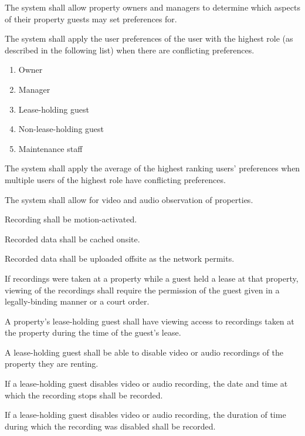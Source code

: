 \documentclass[letter,titlepage,oneside,english]{report}
\begin{document}
\begin{fr}
\begin{fr}
  \item
    The system shall allow property owners and managers to determine which aspects of their property guests may set preferences for.
  \item\label{fr:preferences:order}
    The system shall apply the user preferences of the user with the highest role (as described in the following list) when there are conflicting preferences.
    \begin{enumerate}
    \item
      Owner
    \item
      Manager
    \item
      Lease-holding guest
    \item
      Non-lease-holding guest
    \item
      Maintenance staff
    \end{enumerate}
  \item
    The system shall apply the average of the highest ranking users' preferences when multiple users of the highest role have conflicting preferences.
  \end{fr}
\item
  The system shall allow for video and audio observation of properties.
  \begin{fr}
  \item
    Recording shall be motion-activated.
  \item
    Recorded data shall be cached onsite.
  \item
    Recorded data shall be uploaded offsite as the network permits.
  \item
    If recordings were taken at a property while a guest held a lease at that property, viewing of the recordings shall require the permission of the guest given in a legally-binding manner or a court order.
  \item
    A property's lease-holding guest shall have viewing access to recordings taken at the property during the time of the guest's lease.
  \item
    A lease-holding guest shall be able to disable video or audio recordings of the property they are renting.
    \begin{fr}
    \item
      If a lease-holding guest disables video or audio recording, the date and time at which the recording stops shall be recorded.
    \item
      If a lease-holding guest disables video or audio recording, the duration of time during which the recording was disabled shall be recorded.

\end{fr}
\end{fr}
\end{fr}
\end{document}
